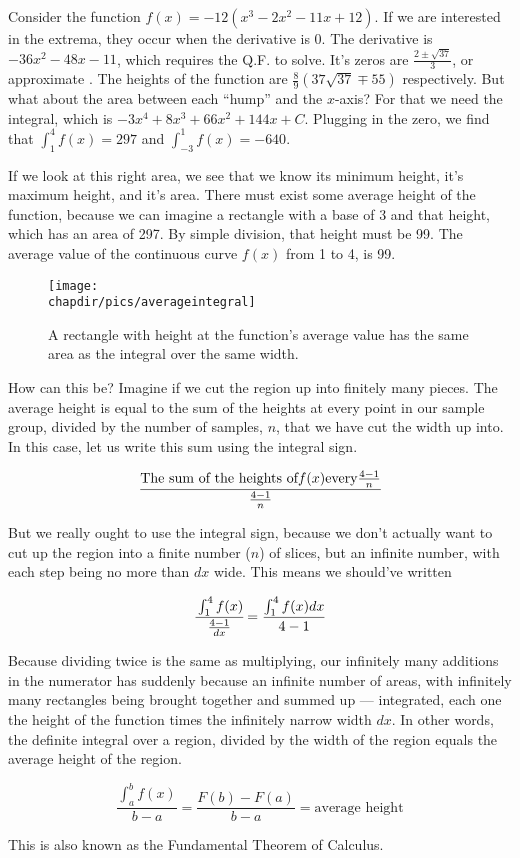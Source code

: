 Consider the function $f(x)=-12(x^3-2x^2-11x+12)$.  If we are interested in the extrema, they 
occur when the derivative is 0.  The derivative is $-36x^2-48x-11$, which requires the Q.F. to
solve.  It's zeros are $\frac{2\pm\sqrt{37}}{3}$, or approximate .  The heights of the function
are $\frac{8}{9}(37\sqrt{37}\mp55)$ respectively.  But what about the area between each 
``hump'' and the $x$-axis?  For that we need the integral, which is $-3x^4+8x^3+66x^2+144x+C$.
Plugging in the zero, we find that $\int_1^4 f(x) = 297$ and $\int_{-3}^1 f(x) = -640$.

If we look at this right area, we see that we know its minimum height, it's maximum height, and
it's area.  There must exist some average height of the function, because we can imagine a rectangle
with a base of 3 and that height, which has an area of 297.  By simple division, that height must be
99.  The average value of the continuous curve $f(x)$ from 1 to 4, is 99.


\begin{figure}[h]
\begin{centering}
\texttt{[image: \\chapdir/pics/averageintegral]}
\caption[Integrals and Averages]{A rectangle with height at the function's average value has the same area as the integral over the same width.}
\end{centering}
\end{figure}

How can this be?  Imagine if we cut the region up into finitely many pieces.  The average height
is equal to the sum of the heights at every point in our sample group, divided by the number of
samples, $n$, that we have cut the width up into.  
In this case, let us write this sum using the integral sign.

$$
\cfrac{\text{The sum of the heights of} f(x) \text{every} \frac{4-1}{n}}{\frac{4-1}{n}}
$$

But we really ought to use the integral sign, because we don't actually want to cut up the region into
a finite number ($n$) of slices, but an infinite number, with each step being no more than $dx$ wide.
This means we should've written

$$
\cfrac{\int_1^4 f(x)}{\frac{4-1}{dx}} = \frac{\int_1^4 f(x)dx}{4-1}
$$

Because dividing twice is the same as multiplying, our infinitely many additions in the numerator
has suddenly because an infinite number of areas, with infinitely many rectangles being brought
together and summed up --- integrated, each one the height of the function times the infinitely
narrow width $dx$.  In other words, the definite integral over a region, divided by the width of
the region equals the average height of the region.

$$
\frac{\int_a^b f(x)}{b-a} = \frac{F(b)-F(a)}{b-a} = \text{average height}
$$

This is also known as the Fundamental Theorem of Calculus.